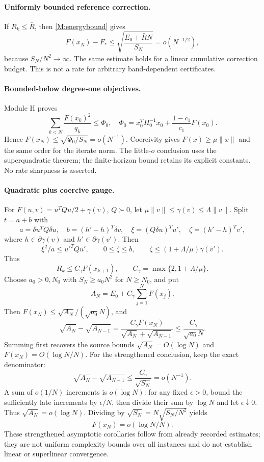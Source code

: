 \paragraph{Uniformly bounded reference correction.}
If $R_k\le\bar R$, then \eqref{M:energybound} gives
\[
 F(x_N)-F_*\le\sqrt{\frac{E_0+\bar RN}{S_N}}=o(N^{-1/2}),
\]
because $S_N/N^2\to\infty$. The same estimate holds for a linear cumulative correction budget. This is not a rate for arbitrary band-dependent certificates.

\paragraph{Bounded-below degree-one objectives.}
Module H proves
\[
 \sum_{k<N}\frac{F(x_k)^2}{q_k}\le\Phi_0,
\quad \Phi_0=x_0^TH_0^{-1}x_0+\frac{1-c_1}{c_1}F(x_0).
\]
Hence $F(x_N)\le\sqrt{\Phi_0/S_N}=o(N^{-1})$. Coercivity gives $F(x)\ge\mu\|x\|$ and the same order for the iterate norm. The little-$o$ conclusion uses the superquadratic theorem; the finite-horizon bound retains its explicit constants. No rate sharpness is asserted.

\paragraph{Quadratic plus coercive gauge.}
For $F(u,v)=u^TQu/2+\gamma(v)$, $Q\succ0$, let $\mu\|v\|\le\gamma(v)\le\Lambda\|v\|$. Split $t=a+b$ with
\[
 a=\delta u^TQ\delta u,\quad b=(h'-h)^T\delta v,\quad
 \xi=(Q\delta u)^Tu',\quad\zeta=(h'-h)^Tv',
\]
where $h\in\partial\gamma(v)$ and $h'\in\partial\gamma(v')$. Then
\[
 \xi^2/a\le u'^TQu',\qquad0\le\zeta\le b,
 \qquad\zeta\le(1+\Lambda/\mu)\gamma(v').
\]
Thus
\[
 R_k\le C_\gamma F(x_{k+1}),\qquad
 C_\gamma=\max\{2,1+\Lambda/\mu\}.
\]
Choose $a_0>0,N_0$ with $S_N\ge a_0N^2$ for $N\ge N_0$, and put
\[
 A_N=E_0+C_\gamma\sum_{j=1}^NF(x_j).
\]
Then $F(x_N)\le\sqrt{A_N}/(\sqrt{a_0}N)$, and
\[
 \sqrt{A_N}-\sqrt{A_{N-1}}
 =\frac{C_\gamma F(x_N)}{\sqrt{A_N}+\sqrt{A_{N-1}}}
 \le\frac{C_\gamma}{\sqrt{a_0}N}.
\]
Summing first recovers the source bounds $\sqrt{A_N}=O(\log N)$ and $F(x_N)=O(\log N/N)$. For the strengthened conclusion, keep the exact denominator:
\[
 \sqrt{A_N}-\sqrt{A_{N-1}}\le \frac{C_\gamma}{\sqrt{S_N}}=o(N^{-1}).
\]
A sum of $o(1/N)$ increments is $o(\log N)$: for any fixed $\epsilon>0$, bound the sufficiently late increments by $\epsilon/N$, then divide their sum by $\log N$ and let $\epsilon\downarrow0$. Thus $\sqrt{A_N}=o(\log N)$. Dividing by $\sqrt{S_N}=N\sqrt{S_N/N^2}$ yields
\[
 \boxed{F(x_N)=o(\log N/N).}
\]
These strengthened asymptotic corollaries follow from already recorded estimates; they are not uniform complexity bounds over all instances and do not establish linear or superlinear convergence.

